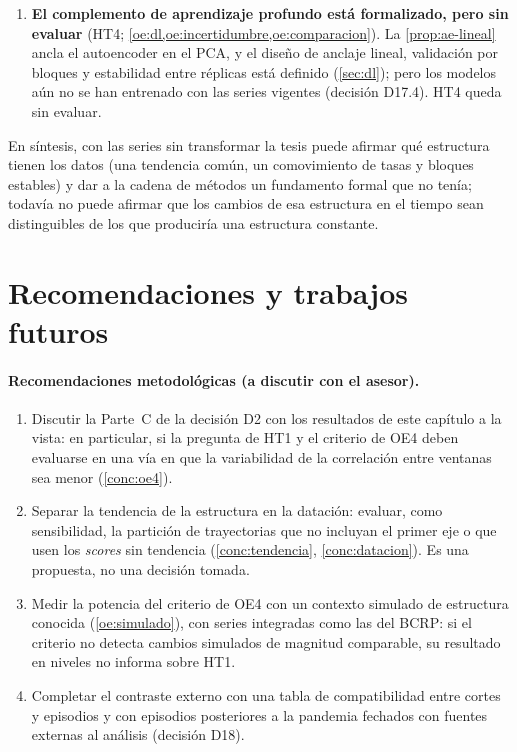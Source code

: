 \begin{enumerate}[label=\textbf{C\arabic*.}, ref=C\arabic*, leftmargin=*]
    cortes es poco estable y los episodios intermedios no se separan (\cref{sec:res-datacion,sec:res-validacion}).
    HT3 queda parcialmente sostenida.
  \item\label{conc:dl} \textbf{El complemento de aprendizaje profundo está formalizado, pero sin
    evaluar} (HT4; \cref{oe:dl,oe:incertidumbre,oe:comparacion}). La \cref{prop:ae-lineal} ancla el
    autoencoder en el PCA, y el diseño de anclaje lineal, validación por bloques y estabilidad entre
    réplicas está definido (\cref{sec:dl}); pero los modelos aún no se han entrenado con las
    \nSeries{} series vigentes (decisión D17.4). HT4 queda sin evaluar.
\end{enumerate}

En síntesis, con las series sin transformar la tesis puede afirmar qué estructura tienen los datos
(una tendencia común, un comovimiento de tasas y bloques estables) y dar a la cadena de métodos un
fundamento formal que no tenía; todavía no puede afirmar que los cambios de esa estructura en el
tiempo sean distinguibles de los que produciría una estructura constante.

\section{Recomendaciones y trabajos futuros}
\label{sec:conc-recomendaciones}

\paragraph{Recomendaciones metodológicas (a discutir con el asesor).}

\begin{enumerate}[label=\textbf{R\arabic*.}, ref=R\arabic*, leftmargin=*]
  \item Discutir la Parte~C de la decisión D2 con los resultados de este capítulo a la vista:
    en particular, si la pregunta de HT1 y el criterio de OE4 deben evaluarse en una vía en que la
    variabilidad de la correlación entre ventanas sea menor (\ref{conc:oe4}).
  \item Separar la tendencia de la estructura en la datación: evaluar, como sensibilidad, la
    partición de trayectorias que no incluyan el primer eje o que usen los \emph{scores} sin
    tendencia (\ref{conc:tendencia}, \ref{conc:datacion}). Es una propuesta, no una decisión
    tomada.
  \item Medir la potencia del criterio de OE4 con un contexto simulado de estructura conocida
    (\cref{oe:simulado}), con series integradas como las del BCRP: si el criterio no detecta
    cambios simulados de magnitud comparable, su resultado en niveles no informa sobre HT1.
  \item Completar el contraste externo con una tabla de compatibilidad entre cortes y episodios y
    con episodios posteriores a la pandemia fechados con fuentes externas al análisis (decisión
    D18).
\end{enumerate}

